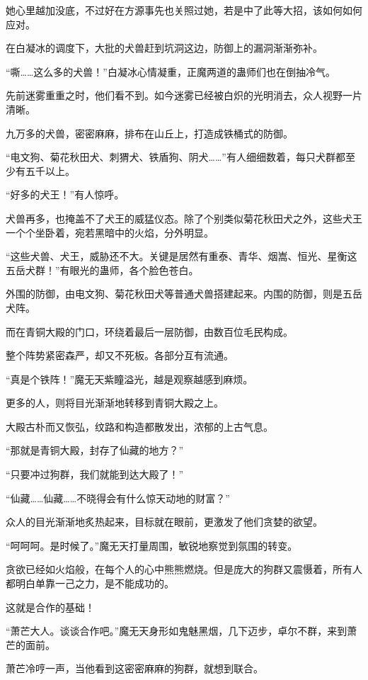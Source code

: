 \begin{this_body}
她心里越加没底，不过好在方源事先也关照过她，若是中了此等大招，该如何如何应对。

在白凝冰的调度下，大批的犬兽赶到坑洞这边，防御上的漏洞渐渐弥补。

“嘶……这么多的犬兽！”白凝冰心情凝重，正魔两道的蛊师们也在倒抽冷气。

先前迷雾重重之时，他们看不到。如今迷雾已经被白炽的光明消去，众人视野一片清晰。

九万多的犬兽，密密麻麻，排布在山丘上，打造成铁桶式的防御。

“电文狗、菊花秋田犬、刺猬犬、铁盾狗、阴犬……”有人细细数着，每只犬群都至少有五千以上。

“好多的犬王！”有人惊呼。

犬兽再多，也掩盖不了犬王的威猛仪态。除了个别类似菊花秋田犬之外，这些犬王一个个坐卧着，宛若黑暗中的火焰，分外明显。

“这些犬兽、犬王，威胁还不大。关键是居然有重泰、青华、烟嵩、恒光、星衡这五岳犬群！”有眼光的蛊师，各个脸色苍白。

外围的防御，由电文狗、菊花秋田犬等普通犬兽搭建起来。内围的防御，则是五岳犬阵。

而在青铜大殿的门口，环绕着最后一层防御，由数百位毛民构成。

整个阵势紧密森严，却又不死板。各部分互有流通。

“真是个铁阵！”魔无天紫瞳溢光，越是观察越感到麻烦。

更多的人，则将目光渐渐地转移到青铜大殿之上。

大殿古朴而又恢弘，纹路和构造都散发出，浓郁的上古气息。

“那就是青铜大殿，封存了仙藏的地方？”

“只要冲过狗群，我们就能到达大殿了！”

“仙藏……仙藏……不晓得会有什么惊天动地的财富？”

众人的目光渐渐地炙热起来，目标就在眼前，更激发了他们贪婪的欲望。

“呵呵呵。是时候了。”魔无天打量周围，敏锐地察觉到氛围的转变。

贪欲已经如火焰般，在每个人的心中熊熊燃烧。但是庞大的狗群又震慑着，所有人都明白单靠一己之力，是不能成功的。

这就是合作的基础！

“萧芒大人。谈谈合作吧。”魔无天身形如鬼魅黑烟，几下迈步，卓尔不群，来到萧芒的面前。

萧芒冷哼一声，当他看到这密密麻麻的狗群，就想到联合。


\end{this_body}
